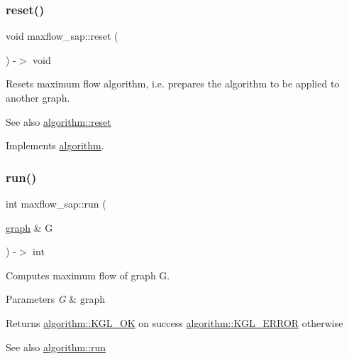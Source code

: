 \subsubsection{\texorpdfstring{reset()}{reset()}}
{\footnotesize\ttfamily void maxflow\+\_\+sap\+::reset (\begin{DoxyParamCaption}{ }\end{DoxyParamCaption}) -\/$>$ void\hspace{0.3cm}{\ttfamily [virtual]}}

Resets maximum flow algorithm, i.\+e. prepares the algorithm to be applied to another graph.

\begin{DoxySeeAlso}{See also}
\mbox{\hyperlink{classalgorithm_aea645f2e39976a477c8f8564656fd1b6}{algorithm\+::reset}} 
\end{DoxySeeAlso}


Implements \mbox{\hyperlink{classalgorithm_aea645f2e39976a477c8f8564656fd1b6}{algorithm}}.

\mbox{\label{classmaxflow__sap_ab46f7d6fbabeaf7b252b9f9a0e018f24}} 
\subsubsection{\texorpdfstring{run()}{run()}}
{\footnotesize\ttfamily int maxflow\+\_\+sap\+::run (\begin{DoxyParamCaption}\item[{\mbox{\hyperlink{classgraph}{graph}} \&}]{G }\end{DoxyParamCaption}) -\/$>$ int\hspace{0.3cm}{\ttfamily [virtual]}}

Computes maximum flow of graph {\ttfamily G}.


\begin{DoxyParams}{Parameters}
{\em G} & graph \\
\hline
\end{DoxyParams}
\begin{DoxyReturn}{Returns}
{\ttfamily \mbox{\hyperlink{classalgorithm_af1a0078e153aa99c24f9bdf0d97f6710aae4c1cd7fe8d8cf4b143241a6e7c31cf}{algorithm\+::\+K\+G\+L\+\_\+\+OK}}} on success {\ttfamily \mbox{\hyperlink{classalgorithm_af1a0078e153aa99c24f9bdf0d97f6710ae67bf27b2ef31f73e545a7f9f4a69556}{algorithm\+::\+K\+G\+L\+\_\+\+E\+R\+R\+OR}}} otherwise 
\end{DoxyReturn}
\begin{DoxySeeAlso}{See also}
\mbox{\hyperlink{classalgorithm_a482eb28cacba018b5a86d3a819a50a2f}{algorithm\+::run}} 
\end{DoxySeeAlso}


